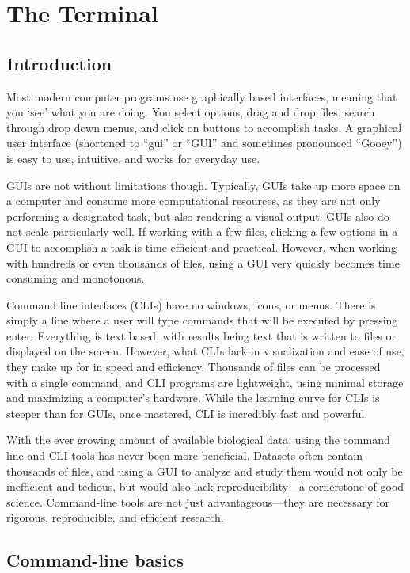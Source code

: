 \chapter{The Terminal}

\section{Introduction}

Most modern computer programs use graphically based interfaces, meaning that you `see' what you are doing. You select options, drag and drop files, search through drop down menus, and click on buttons to accomplish tasks. A graphical user interface (shortened to ``gui'' or ``GUI'' and sometimes pronounced ``Gooey'') is easy to use, intuitive, and works for everyday use.

GUIs are not without limitations though. Typically, GUIs take up more space on a computer and consume more computational resources, as they are not only performing a designated task, but also rendering a visual output. GUIs also do not scale particularly well. If working with a few files, clicking a few options in a GUI to accomplish a task is time efficient and practical. However, when working with hundreds or even thousands of files, using a GUI very quickly becomes time consuming and monotonous.

Command line interfaces (CLIs) have no windows, icons, or menus. There is simply a line where a user will type commands that will be executed by pressing enter. Everything is text based, with results being text that is written to files or displayed on the screen. However, what CLIs lack in visualization and ease of use, they make up for in speed and efficiency. Thousands of files can be processed with a single command, and CLI programs are lightweight, using minimal storage and maximizing a computer's hardware. While the learning curve for CLIs is steeper than for GUIs, once mastered, CLI is incredibly fast and powerful.

With the ever growing amount of available biological data, using the command line and CLI tools has never been more beneficial. Datasets often contain thousands of files, and using a GUI to analyze and study them would not only be inefficient and tedious, but would also lack reproducibility---a cornerstone of good science. Command-line tools are not just advantageous---they are necessary for rigorous, reproducible, and efficient research.

\section{Command-line basics}

